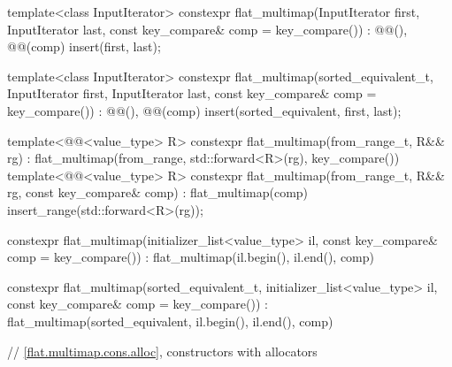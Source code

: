 \begin{codeblock}
{{    template<class InputIterator>
      constexpr flat_multimap(InputIterator first, InputIterator last,
                              const key_compare& comp = key_compare())
        : @@(), @@(comp)
        { insert(first, last); }

    template<class InputIterator>
      constexpr flat_multimap(sorted_equivalent_t, InputIterator first, InputIterator last,
                              const key_compare& comp = key_compare())
        : @@(), @@(comp) { insert(sorted_equivalent, first, last); }

    template<@@<value_type> R>
      constexpr flat_multimap(from_range_t, R&& rg)
        : flat_multimap(from_range, std::forward<R>(rg), key_compare()) { }
    template<@@<value_type> R>
      constexpr flat_multimap(from_range_t, R&& rg, const key_compare& comp)
        : flat_multimap(comp) { insert_range(std::forward<R>(rg)); }

    constexpr flat_multimap(initializer_list<value_type> il,
                            const key_compare& comp = key_compare())
      : flat_multimap(il.begin(), il.end(), comp) { }

    constexpr flat_multimap(sorted_equivalent_t, initializer_list<value_type> il,
                            const key_compare& comp = key_compare())
      : flat_multimap(sorted_equivalent, il.begin(), il.end(), comp) { }

    // \ref{flat.multimap.cons.alloc}, constructors with allocators

}}
\end{codeblock}
